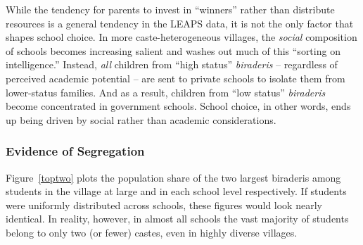 \documentclass[Eubank_pk_ethnic_sorting.tex]{subfiles}
\begin{document}
While the tendency for parents to invest in ``winners'' rather than distribute resources is a general tendency in the LEAPS data, it is not the only factor that shapes school choice.  In more caste-heterogeneous villages, the \emph{social} composition of schools becomes increasing salient and washes out much of this ``sorting on intelligence.'' Instead, \emph{all} children from ``high status'' \emph{biraderis} -- regardless of perceived academic potential -- are sent to private schools to isolate them from lower-status families. And as a result, children from ``low status'' \emph{biraderis} become concentrated in government schools. School choice, in other words, ends up being driven by social rather than academic considerations.

\subsubsection{Evidence of Segregation}

Figure~\ref{toptwo} plots the population share of the two largest biraderis among students in the village at large and in each school level respectively. If students were uniformly distributed across schools, these figures would look nearly identical. In reality, however, in almost all schools the vast majority of students belong to only two (or fewer) castes, even in highly diverse villages.
\end{document}
